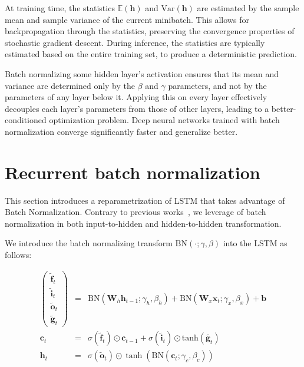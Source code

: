 \documentclass{article} %
\newcommand{\vect}[1]{\mathbf{#1}}
\newcommand{\mat}[1]{\mathbf{#1}}
\newcommand{\ewprod}{\odot}
\begin{document}
At training time, the statistics $\mathbb{E}(\vect{h})$ and $\mathrm{Var}(\vect{h})$ are estimated by the sample mean and sample variance of the current minibatch.
This allows for backpropagation through the statistics, preserving the convergence properties of stochastic gradient descent.
During inference, the statistics are typically estimated based on the entire training set, to produce a deterministic prediction.

Batch normalizing some hidden layer's activation ensures that its mean and variance are determined only by the $\beta$ and $\gamma$ parameters, and not by the parameters of any layer below it.
Applying this on every layer effectively decouples each layer's parameters from those of other layers, leading to a better-conditioned optimization problem.
Deep neural networks trained with batch normalization converge significantly faster and generalize better.

\section{Recurrent batch normalization}
\label{sec:recurrent-batch-normalization}

This section introduces a reparametrization of LSTM that takes advantage
of Batch Normalization. Contrary to previous works~\cite{cesar, baidu}, we leverage of batch normalization in both input-to-hidden and hidden-to-hidden transformation.


We introduce the batch normalizing transform $\mathrm{BN}(\cdot; \gamma, \beta)$ into the LSTM as follows:

\begin{eqnarray}
\left(\begin{array}{ccc}
\tilde{\vect{f}}_t \\
\tilde{\vect{i}}_t \\
\tilde{\vect{o}}_t \\
\tilde{\vect{g}}_t
\end{array}\right)
 &=&
 \mathrm{BN} (\mat{W}_h \vect{h}_{t-1}; \gamma_h, \beta_h) +
 \mathrm{BN} (\mat{W}_x \vect{x}_t    ; \gamma_x, \beta_x) +
 \vect{b}
\\
\vect{c}_t &=& \sigma(\tilde{\vect{f}}_t) \ewprod \vect{c}_{t-1} +
              \sigma(\tilde{\vect{i}}_t) \ewprod \mathrm{tanh}(\tilde{\vect{g}_t}) \\
\vect{h}_t &=& \sigma(\tilde{\vect{o}}_t) \ewprod \tanh(
 \mathrm{BN} (\vect{c}_t; \gamma_c, \beta_c)
)
\end{eqnarray}
\end{document}
